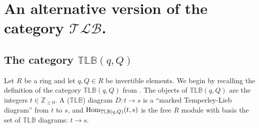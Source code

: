\documentclass[12pt]{amsart}
\theoremstyle{definition}
\theoremstyle{remark}
\numberwithin{equation}{section}
\newcommand{\Z}{{\mathbb Z}}
\newcommand{\lr}{\longrightarrow}
\newcommand{\Hom}{{\rm{Hom}}}
\newcommand{\TLBB}{{\mathbb{TLB}}}
\newcommand{\TLBC}{\mathcal{TLB}}
\begin{document}
\section{An alternative version of the category $\TLBC$.}\label{sect:TLB-old}

\subsection{The category $\TLBB(q,Q)$}
Let $R$ be a ring and let $q,Q\in R$ be invertible elements. We begin by recalling 
the definition of the category $\TLBB(q,Q)$ from \cite{GL03}. The objects of $\TLBB(q,Q)$ are
the integers $t\in\Z_{\geq 0}$. A ($\TLBB$) diagram $D:t\lr s$ is a ``marked Temperley-Lieb diagram'' from $t$ to $s$,
and $\Hom_{\TLBB(q,Q)}(t,s)$ is the free $R$ module with basis the set of $\TLBB$ diagrams: $t\lr s$.
\end{document}
